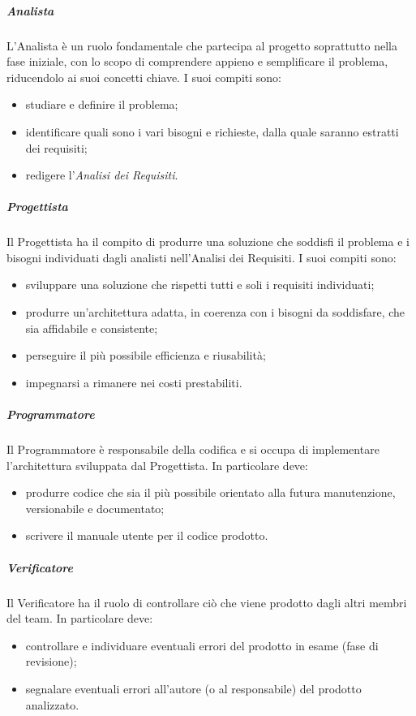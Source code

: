 \subparagraph{Analista}
L'Analista è un ruolo fondamentale che partecipa al progetto soprattutto nella fase iniziale, con lo scopo di comprendere appieno e semplificare il problema, riducendolo ai suoi concetti chiave.
I suoi compiti sono:
\begin{itemize}
\item studiare e definire il problema;
\item identificare quali sono i vari bisogni e richieste, dalla quale saranno estratti dei requisiti;
\item redigere l'\textit{Analisi dei Requisiti}.
\end{itemize}

\subparagraph{Progettista}
Il Progettista ha il compito di produrre una soluzione che soddisfi il problema e i bisogni individuati dagli analisti nell'Analisi dei Requisiti.
I suoi compiti sono:
\begin{itemize}
\item sviluppare una soluzione che rispetti tutti e soli i requisiti individuati;
\item produrre un'architettura adatta, in coerenza con i bisogni da soddisfare, che sia affidabile e consistente;
\item perseguire il più possibile efficienza e riusabilità;
\item impegnarsi a rimanere nei costi prestabiliti.
\end{itemize}


\subparagraph{Programmatore}
Il Programmatore è responsabile della codifica e si occupa di implementare l'architettura sviluppata dal Progettista.
In particolare deve:
\begin{itemize}
\item produrre codice che sia il più possibile orientato alla futura manutenzione, versionabile e documentato;
\item scrivere il manuale utente per il codice prodotto.
\end{itemize}

\subparagraph{Verificatore}
Il Verificatore ha il ruolo di controllare ciò che viene prodotto dagli altri membri del team.
In particolare deve:
\begin{itemize}
\item controllare e individuare eventuali errori del prodotto in esame (fase di revisione);
\item segnalare eventuali errori all'autore (o al responsabile) del prodotto analizzato.
\end{itemize}


